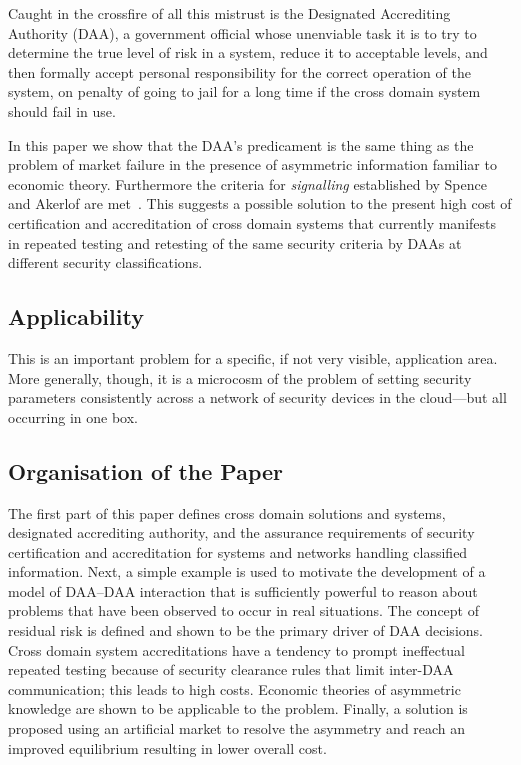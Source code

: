 \documentclass{llncs}
\begin{document}
Caught in the crossfire of all this mistrust is the Designated Accrediting
Authority (DAA), a government official whose unenviable task it is to try to
determine the true level of risk in a system, reduce it to acceptable
levels, and then formally accept personal responsibility for the correct
operation of the system, on penalty of going to jail for a long time
if the cross domain system should fail in use.

In this paper we show that the DAA's predicament is the same thing as the
problem of market failure in the presence of asymmetric information familiar
to economic theory.  Furthermore the criteria for \emph{signalling}
established by Spence and Akerlof are met~\cite{Akerlof1970,Spence1973}.
This suggests a possible solution
to the present high cost of certification and accreditation of cross domain systems
that currently manifests in repeated testing and retesting of the same security criteria
by DAAs at different security classifications.

\subsection{Applicability}

This is an important problem for a specific, if not very visible, application area.
More generally, though, it is 
a microcosm of the problem of setting security parameters consistently
across a network of security devices in the cloud---but all occurring in one box.

\subsection{Organisation of the Paper}

The first part of this paper defines cross domain solutions and systems, designated
accrediting authority, and the assurance requirements of security
certification and accreditation for systems and networks handling
classified information.  Next, a simple example is used to motivate
the development of a model of DAA--DAA interaction that is sufficiently
powerful to reason about problems that have been observed to occur in
real situations.  The concept of residual risk is defined and
shown to be the primary driver of DAA decisions.  Cross domain system accreditations
have a tendency to prompt ineffectual
repeated testing because of security clearance rules that limit inter-DAA
communication; this leads to high
costs.  Economic theories of asymmetric knowledge are shown to be
applicable to the problem.  Finally, a solution is proposed using an
artificial market to resolve the asymmetry and reach an improved
equilibrium resulting in lower overall cost.
\end{document}
